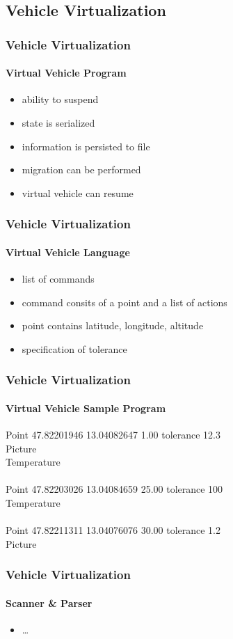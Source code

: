\documentclass{beamer}
\begin{document}
\subsection{Vehicle Virtualization}

\begin{frame}\frametitle{Vehicle Virtualization}\framesubtitle{Virtual Vehicle Program}
\begin{itemize}
\item ability to suspend
\item state is serialized
\item information is persisted to file
\item migration can be performed
\item virtual vehicle can resume
\end{itemize} 
\end{frame}

\begin{frame}\frametitle{Vehicle Virtualization}\framesubtitle{Virtual Vehicle Language}
\begin{itemize}
\item list of commands
\item command consits of a point and a list of actions
\item point contains latitude, longitude, altitude
\item specification of tolerance
\end{itemize} 
\end{frame}

\begin{frame}\frametitle{Vehicle Virtualization}\framesubtitle{Virtual Vehicle Sample Program}
Point 47.82201946 13.04082647 1.00 tolerance 12.3\\
Picture \\
Temperature\\
\\
Point 47.82203026 13.04084659 25.00 tolerance 100 \\
Temperature\\
\\
Point 47.82211311 13.04076076 30.00 tolerance 1.2\\
Picture
\end{frame}

\begin{frame}\frametitle{Vehicle Virtualization}\framesubtitle{Scanner \& Parser}
\begin{itemize}
\item \ldots
\end{itemize} 
\end{frame}
\end{document}
